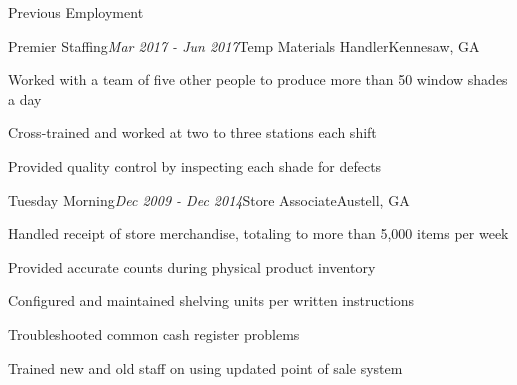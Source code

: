 \documentclass[11pt]{resume} %
\begin{document}

\begin{rSection}{Previous Employment}

\begin{rSubsection}{Premier Staffing}{\em Mar 2017 - Jun 2017}{Temp Materials Handler}{Kennesaw, GA}
\item Worked with a team of five other people to produce more than 50 window shades a day
\item Cross-trained and worked at two to three stations each shift
\item Provided quality control by inspecting each shade for defects %
\end{rSubsection}

\begin{rSubsection}{Tuesday Morning}{\em Dec 2009 - Dec 2014}{Store Associate}{Austell, GA}
\item Handled receipt of store merchandise, totaling to more than 5,000 items per week
\item Provided accurate counts during physical product inventory
\item Configured and maintained shelving units per written instructions
\item Troubleshooted common cash register problems
\item Trained new and old staff on using updated point of sale system
\end{rSubsection}

\end{rSection}










\end{document}
